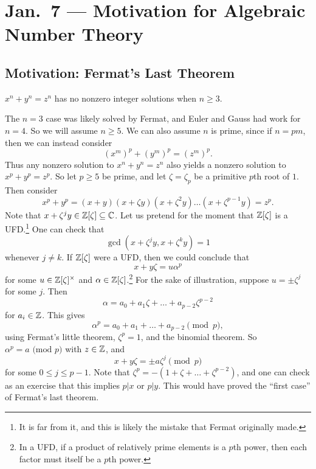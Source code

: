 \chapter{Jan.~7 --- Motivation for Algebraic Number Theory}

\section{Motivation: Fermat's Last Theorem}

\begin{theorem}
  $x^n + y^n = z^n$
  has no nonzero integer solutions when $n \ge 3$.
\end{theorem}

\begin{remark}
  The $n = 3$ case was likely solved by Fermat, and
  Euler and Gauss had work for $n = 4$. So we will
  assume
  $n \ge 5$. We can also assume $n$ is prime, since
  if $n = pm$, then we can instead consider
  \[
    (x^m)^p + (y^m)^p = (z^m)^p.
  \]
  Thus any nonzero solution to $x^n + y^n = z^n$
  also yields a nonzero solution to $x^p + y^p = z^p$.
  So let $p \ge 5$ be prime, and let
  $\zeta = \zeta_p$ be a primitive $p$th root of $1$.
  Then consider
  \[
    x^p + y^p = (x + y) (x + \zeta y) (x + \zeta^2 y) \dots (x + \zeta^{p-1} y) = z^p.
  \]
  Note that $x + \zeta^j y \in \mathbb{Z}[\zeta] \subseteq \mathbb{C}$.
  Let us pretend for the moment that $\mathbb{Z}[\zeta]$ is
  a UFD.\footnote{It is far from it, and this is likely the mistake that Fermat originally made.}
  One can check that
  \[
    \gcd(x + \zeta^j y, x + \zeta^k y) = 1
  \]
  whenever $j \ne k$. If $\mathbb{Z}[\zeta]$ were a UFD, then
  we could conclude that
  \[
    x + y \zeta = u \alpha^p
  \]
  for some $u \in \mathbb{Z}[\zeta]^\times$ and
  $\alpha \in \mathbb{Z}[\zeta]$.\footnote{In a UFD, if a product of relatively prime elements is a $p$th power, then each factor must itself be a $p$th power.}
  For the sake of illustration, suppose $u = \pm \zeta^j$
  for some $j$.
  Then
  \[
    \alpha = a_0 + a_1 \zeta + \dots + a_{p - 2} \zeta^{p - 2}
  \]
  for $a_i \in \mathbb{Z}$. This gives
  \[
    \alpha^p = a_0 + a_1 + \dots + a_{p - 2} \pmod{p},
  \]
  using Fermat's little theorem, $\zeta^p = 1$,
  and the binomial theorem. So
  $\alpha^p = a \text{ (mod $p$)}$ with $z \in \mathbb{Z}$,
  and
  \[
    x + y \zeta = \pm a \zeta^j \pmod{p}
  \]
  for some $0 \le j \le p - 1$. Note that
  $\zeta^p = -(1 + \zeta + \dots + \zeta^{p - 2})$,
  and one can check as an exercise that this implies
  $p | x$ or $p | y$. This would have proved the
  ``first case'' of Fermat's last theorem.
\end{remark}

